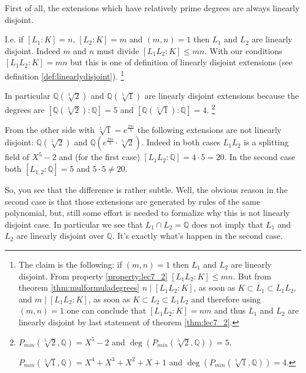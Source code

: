 \begin{example}
  First of all, the extensions which have relatively prime degrees are
  always linearly disjoint.

  I.e. if $\left[L_1 : K\right] = n$, $\left[L_2 : K\right] = m$ and
  $\left(m, n\right) = 1$ then $L_1$ and $L_2$ are linearly
  disjoint. Indeed $m$ and $n$ must divide $\left[L_1 L_2 : K\right]
  \le m n$. With our conditions $\left[L_1 L_2 : K\right] = m n$ but
  this is one of definition of linearly disjoint extensions
  (see definition \ref{def:linearlydisjoint}).
  \footnote{
    The claim is the following: if $\left(m, n\right) = 1$ then $L_1$
    and $L_2$ are linearly disjoint. From
    property \ref{property:lec7_2} $\left[L_1 L_2 : K\right] \le m
    n$. But from theorem 
    \ref{thm:mulformuladegrees} $n \mid \left[L_1 L_2 : K\right]$, as
    soon as $K \subset L_1 \subset L_1 L_2$, and
    $m \mid \left[L_1 L_2 : K\right]$, as
    soon as $K \subset L_2 \subset L_1 L_2$ and therefore using
    $\left(m, n\right) = 1$ one can conclude that $\left[L_1 L_2 :
      K\right] = nm$ and thus $L_1$  and $L_2$ are linearly
    disjoint by last statement of theorem \ref{thm:lec7_2}. 
  }

  In particular $\mathbb{Q}\left(\sqrt[5]{2}\right)$ and
  $\mathbb{Q}\left(\sqrt[5]{1}\right)$ are linearly disjoint
  extensions because the degrees are
  $\left[\mathbb{Q}\left(\sqrt[5]{2}\right): \mathbb{Q}\right] = 5$
  and
  $\left[\mathbb{Q}\left(\sqrt[5]{1}\right): \mathbb{Q}\right] = 4$.
  \footnote{
    $P_{min}\left(\sqrt[5]{2}, \mathbb{Q}\right) = X^5 - 2$ and
    $\deg\left(P_{min}\left(\sqrt[5]{2}, \mathbb{Q}\right)\right) =
    5$.

    $P_{min}\left(\sqrt[5]{1}, \mathbb{Q}\right) = X^4 + X^3 + X^2 + X
    + 1$ and
    $\deg\left(P_{min}\left(\sqrt[5]{1}, \mathbb{Q}\right)\right) =
    4$.
  }

  From the other side with $\sqrt[5]{1} = e^{\frac{2 \pi i}{5}}$ the
  following extensions are not linearly disjoint:
  $\mathbb{Q}\left(\sqrt[5]{2}\right)$ and
  $\mathbb{Q}\left(e^{\frac{2 \pi i}{5}} \cdot
  \sqrt[5]{2}\right)$.
  Indeed in both cases $L_1 L_2$ is a splitting
  field of $X^5 - 2$ and (for the first case) $\left[L_1 L_2 :
    \mathbb{Q}\right] = 4 \cdot 5 = 20$. In the second case both
  $\left[L_{1,2}:\mathbb{Q}\right] = 5$ and $5 \cdot 5 \ne 20$.

   So, you see that the difference is rather subtle. Well, the obvious
   reason in the second case is that those extensions are generated by
   rules of the same polynomial, but, still some effort is needed to
   formalize why this is not linearly disjoint case.
   In particular we see that $L_1 \cap L_2 = \mathbb{Q}$ does not
   imply that $L_1$ and $L_2$ are linearly disjoint over
   $\mathbb{Q}$. It's exactly what's happen in the second case.
   \label{ex:lec7_1}
\end{example}

